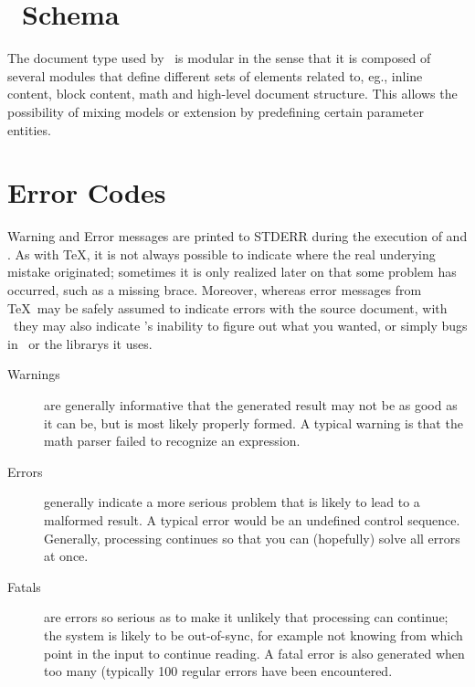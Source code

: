 \documentclass{book}
\begin{document}
\makeatletter\def\verbatim@font{\normalfont\ttfamily}\makeatother
\chapter[Schema]{\LaTeXML\ Schema}\label{schema}
The document type used by \LaTeXML\ is modular in the sense
that it is composed of several modules that define different
sets of elements related to, eg., inline content, block content,
math and high-level document structure.  This allows the possibility
of mixing models or extension by predefining certain parameter entities.



\chapter{Error Codes}\label{errorcodes}
Warning and Error messages are printed to STDERR during the execution
of  and .  As with \TeX, it is
not always possible to indicate where the real underying mistake
originated; sometimes it is only realized later on that some problem
has occurred, such as a missing brace. Moreover, whereas error messages
from \TeX\ may be safely assumed to indicate errors with the source
document, with \LaTeXML\ they may also indicate \LaTeXML's inability
to figure out what you wanted, or simply bugs in \LaTeXML\ or the librarys it uses.

\begin{description}
\item[Warnings] are generally
informative that the generated result may not be as good as it can be,
but is most likely properly formed.  A typical warning is that
the math parser failed to recognize an expression.
\item[Errors] generally indicate a more serious problem that is likely
to lead to a malformed result.  A typical error would be an undefined
control sequence.  Generally, processing continues so that you can
(hopefully) solve all errors at once.
\item[Fatals] are errors so serious as to make it unlikely that processing
can continue; the system is likely to be out-of-sync, for example
not knowing from which  point in the input to continue reading.
A fatal error is also generated when too many (typically 100 regular errors
have been encountered.
\end{description}
\end{document}
